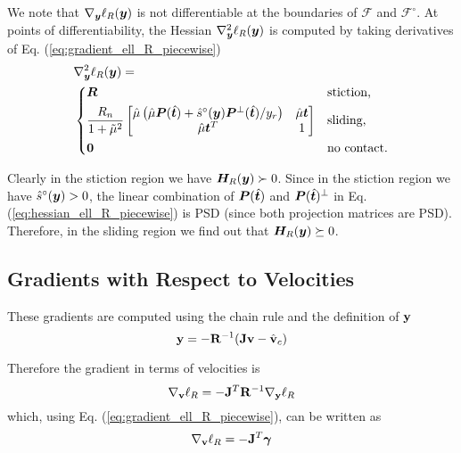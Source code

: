 We note that $\nabla_{\bm{y}}\ell_R({\bm{y}})$ is not differentiable at the
boundaries of $\mathcal{F}$ and $\mathcal{F}^\circ$. At points of
differentiability, the Hessian $\nabla_{\bm{y}}^2\ell_R({\bm{y}})$ is computed by
taking derivatives of Eq. (\ref{eq:gradient_ell_R_piecewise})
\begin{align}
	&\nabla_\vf{y}^2\ell_R(\vf{y}) = 
	\label{eq:hessian_ell_R_piecewise}\\
&\begin{dcases}
	\vf{R} & 
	\text{stiction,}\\
	\frac{R_n}{1+\tilde\mu^2}
	\begin{bmatrix}
		\hat{\mu}\left(\hat{\mu}\vf{P}(\hat{\vf{t}})+\hat{s}^\circ(\vf{y})\vf{P}^\perp(\hat{\vf{t}})/y_r\right) & 
		\hat{\mu}\vf{t}\\
		\hat{\mu}\vf{t}^T & 
		1\\
	\end{bmatrix} &
	\text{sliding,}\\
    \vf{0} & \text{no contact.}
\end{dcases}\nonumber
\end{align}

Clearly in the stiction region we have ${\bm{H}}_R({\bm{y}})\succ 0$.
Since in the stiction region we have $\hat{s}^\circ({\bm{y}})>0$, the linear
combination of ${\bm{P}}(\hat{{\bm{t}}})$ and ${\bm{P}}(\hat{{\bm{t}}})^\perp$ in Eq.
(\ref{eq:hessian_ell_R_piecewise}) is PSD (since both projection matrices are
PSD). Therefore, in the sliding region we find out that
${\bm{H}}_R({\bm{y}})\succeq 0$.

\subsection{Gradients with Respect to Velocities}
These gradients are computed using the chain rule and the definition of ${\mathbf{y}}$
\begin{equation*}
	{\mathbf{y}}=-{\mathbf{R}}^{-1}({\mathbf{J}}{\mathbf{v}} - \hat{{\mathbf{v}}}_c)
\end{equation*}

Therefore the gradient in terms of velocities is
\begin{equation}
	\nabla_\mf{v}\ell_R = -\mf{J}^T\mf{R}^{-1}\nabla_\mf{y}\ell_R
	\label{eq:ell_velocity_gradient}
\end{equation}
which, using Eq. (\ref{eq:gradient_ell_R_piecewise}), can be written as
\begin{equation}
	\nabla_\mf{v}\ell_R = -\mf{J}^T\bgamma
	\label{eq:ell_velocity_gradient_simplified}
\end{equation}

